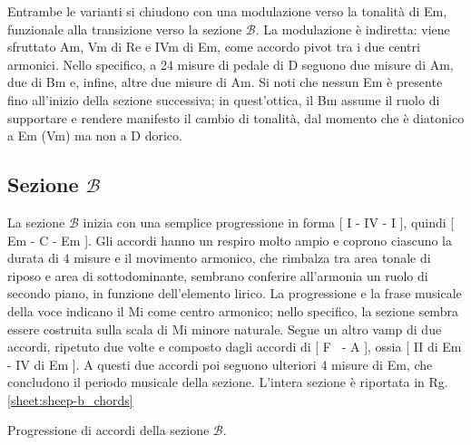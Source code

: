 \documentclass[class=book, crop=false, oneside, 12pt]{standalone}
\begin{document}
    Entrambe le varianti si chiudono con una modulazione verso la tonalità di Em, funzionale alla transizione verso la sezione \(\mathcal{B}\). La modulazione è indiretta: viene sfruttato Am, Vm di Re e IVm di Em,  come accordo pivot tra i due centri armonici. Nello specifico, a 24 misure di pedale di D seguono due misure di Am, due di Bm e, infine, altre due misure di Am. Si noti che nessun Em è presente fino all'inizio della sezione successiva; in quest'ottica,  il Bm assume il ruolo di supportare e rendere manifesto il cambio di tonalità, dal momento che è diatonico a Em (Vm) ma non a D dorico. 

    \subsection*{Sezione \(\mathcal{B}\)}
    La sezione \(\mathcal{B}\) inizia con una semplice progressione in forma [ I - IV - I ], quindi [ Em - C - Em ]. Gli accordi hanno un respiro molto ampio e coprono ciascuno la durata di \(4\) misure e il movimento armonico, che rimbalza tra area tonale di riposo e area di sottodominante, sembrano conferire all'armonia un ruolo di secondo piano, in funzione dell'elemento lirico. La progressione e la frase musicale della voce indicano il Mi come centro armonico; nello specifico, la sezione sembra essere costruita sulla scala di Mi minore naturale.
    Segue un altro vamp di due accordi, ripetuto due volte e composto dagli accordi di [ F\sharp~ - A ], ossia [ II di Em - IV di Em ].  A questi due accordi poi seguono ulteriori \(4\) misure di Em, che concludono il periodo musicale della sezione. L'intera sezione è riportata in Rg.\ref{sheet:sheep-b_chords}

    \begin{sheet}[htbp]
        \centering
        \caption{Progressione di accordi della sezione \(\mathcal{B}\).}
        \label{sheet:sheep-b_chords}
    \end{sheet}
    
\end{document}
